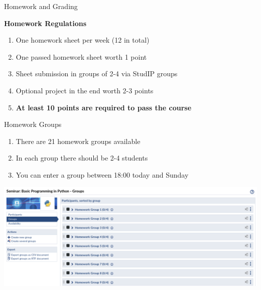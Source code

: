 \begin{frame}{Homework and Grading}

    \begin{alertblock}{\textbf{Homework Regulations}}
    \begin{enumerate}
        \item One homework sheet per week (12 in total)
        \item One passed homework sheet worth 1 point
        \item Sheet submission in groups of 2-4 via StudIP groups
        \item Optional project in the end worth 2-3 points
        \item \textbf{At least 10 points are required to pass the course}
    \end{enumerate}
    \end{alertblock}

\end{frame}

\begin{frame}{Homework Groups}

    \begin{enumerate}
        \item There are 21 homework groups available
        \item In each group there should be 2-4 students
        \item You can enter a group between 18:00 today and Sunday
    \end{enumerate}

    \vspace{1em}

    \includegraphics[width=\textwidth]{01_Introduction/groups.png}

\end{frame}

